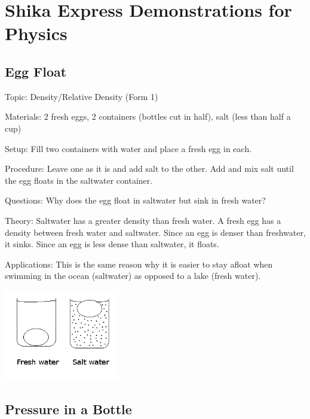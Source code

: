 \setcounter{secnumdepth}{0}

\chapter{Shika Express Demonstrations for Physics}

\section{Egg Float}

\begin{description*}
\item[Topic:]{Density/Relative Density (Form 1)}
\item[Materials:]{2 fresh eggs, 2 containers (bottles cut in half), salt (less than half a cup)}
\item[Setup:]{Fill two containers with water and place a fresh egg in each. }
\item[Procedure:]{Leave one as it is and add salt to the other. Add and mix salt until the egg floats in the saltwater container.}
\item[Questions:]{Why does the egg float in saltwater but sink in fresh water?}
\item[Theory:]{Saltwater has a greater density than fresh water. A fresh egg has a density between fresh water and saltwater. Since an egg is denser than freshwater, it sinks. Since an egg is less dense than saltwater, it floats.}
\item[Applications:]{This is the same reason why it is easier to stay afloat when swimming in the ocean (saltwater) as opposed to a lake (fresh water).}
\end{description*}

\begin{center}
\includegraphics[width=5cm]{./img/egg-float.png}
\end{center}


\section{Pressure in a Bottle}

